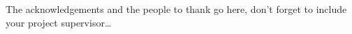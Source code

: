The acknowledgements and the people to thank go here, don't forget to include your project supervisor\ldots
